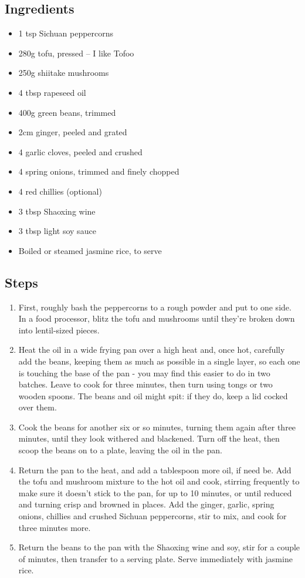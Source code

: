 \documentclass{book}
\begin{document}
\subsection*{Ingredients}
\begin{itemize}
\item 1 tsp Sichuan peppercorns
\item 280g tofu, pressed – I like Tofoo
\item 250g shiitake mushrooms
\item 4 tbsp rapeseed oil
\item 400g green beans, trimmed
\item 2cm ginger, peeled and grated
\item 4 garlic cloves, peeled and crushed
\item 4 spring onions, trimmed and finely chopped
\item 4 red chillies (optional)
\item 3 tbsp Shaoxing wine
\item 3 tbsp light soy sauce
\item Boiled or steamed jasmine rice, to serve
\end{itemize}

\subsection*{Steps}
\begin{enumerate}
\item First, roughly bash the peppercorns to a rough powder and put to one side. In a food processor, blitz the tofu and mushrooms until they’re broken down into lentil-sized pieces.
\item Heat the oil in a wide frying pan over a high heat and, once hot, carefully add the beans, keeping them as much as possible in a single layer, so each one is touching the base of the pan - you may find this easier to do in two batches. Leave to cook for three minutes, then turn using tongs or two wooden spoons. The beans and oil might spit: if they do, keep a lid cocked over them.
\item Cook the beans for another six or so minutes, turning them again after three minutes, until they look withered and blackened. Turn off the heat, then scoop the beans on to a plate, leaving the oil in the pan.
\item Return the pan to the heat, and add a tablespoon more oil, if need be. Add the tofu and mushroom mixture to the hot oil and cook, stirring frequently to make sure it doesn’t stick to the pan, for up to 10 minutes, or until reduced and turning crisp and browned in places. Add the ginger, garlic, spring onions, chillies and crushed Sichuan peppercorns, stir to mix, and cook for three minutes more. 
\item Return the beans to the pan with the Shaoxing wine and soy, stir for a couple of minutes, then transfer to a serving plate. Serve immediately with jasmine rice.
\end{enumerate}
\newpage
\end{document}
